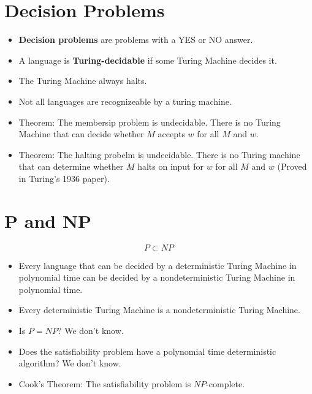 \documentclass[a4paper]{article}
\begin{document}
\begin{multicols}{2}
	\section{Decision Problems}
	\begin{itemize}
		\item \textbf{Decision problems} are problems with a YES or NO answer.
		\item A language is \textbf{Turing-decidable} if some Turing Machine decides
					it.
		\item The Turing Machine always halts.
		\item Not all languages are recognizeable by a turing machine.
		\item Theorem: The membersip problem is undecidable. There is no Turing
					Machine that can decide whether $M$ accepts $w$ for all $M$ and $w$.
		\item Theorem: The halting probelm is undecidable. There is no Turing
					machine that can determine whether $M$ halts on input for $w$ for all
					$M$ and $w$ (Proved in Turing's 1936 paper).
	\end{itemize}

	\section{P and NP}
	$$P \subset NP$$
	\begin{itemize}
		\item Every language that can be decided by a deterministic Turing
					Machine in polynomial time can be decided by a nondeterministic
					Turing Machine in polynomial time.
		\item Every deterministic Turing Machine is a nondeterministic Turing
					Machine.
		\item Is $P = NP$? We don't know.
		\item Does the satisfiability problem have a polynomial time deterministic
					algorithm? We don't know.
		\item Cook's Theorem: The satisfiability problem is $NP$-complete.
	\end{itemize}

\end{multicols}
\end{document}
